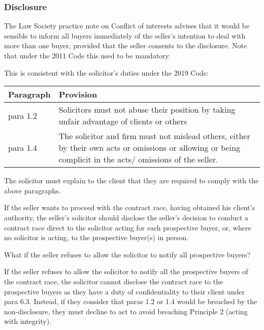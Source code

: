 \documentclass[
]{article}
\newenvironment{env-d6ce83a0-f7a8-46b6-be95-b1235f1feb63}
{
    \savenotes\tcolorbox[blanker,breakable,left=5pt,borderline west={2pt}{-4pt}{gray}]
}
{
    \endtcolorbox\spewnotes
}
\begin{document}
\hypertarget{disclosure}{%
\subsubsection{Disclosure}\label{disclosure}}

The Law Society practice note on Conflict of interests advises that it
would be sensible to inform all buyers immediately of the seller's
intention to deal with more than one buyer, provided that the seller
consents to the disclosure. Note that under the 2011 Code this used to
be mandatory.

This is consistent with the solicitor's duties under the 2019 Code:

\begin{longtable}[]{@{}ll@{}}
\toprule()
Paragraph & Provision \\
\midrule()
\endhead
para 1.2 & Solicitors must not abuse their position by taking unfair
advantage of clients or others \\
para 1.4 & The solicitor and firm must not mislead others, either by
their own acts or omissions or allowing or being complicit in the acts/
omissions of the seller. \\
\bottomrule()
\end{longtable}

The solicitor must explain to the client that they are required to
comply with the above paragraphs.

If the seller wants to proceed with the contract race, having obtained
his client's authority, the seller's solicitor should disclose the
seller's decision to conduct a contract race direct to the solicitor
acting for each prospective buyer, or, where no solicitor is acting, to
the prospective buyer(s) in person.

\begin{env-d6ce83a0-f7a8-46b6-be95-b1235f1feb63}

What if the seller refuses to allow the solicitor to notify all
prospective buyers?

If the seller refuses to allow the solicitor to notify all the
prospective buyers of the contract race, the solicitor cannot disclose
the contract race to the prospective buyers as they have a duty of
confidentiality to their client under para 6.3. Instead, if they
consider that paras 1.2 or 1.4 would be breached by the non-disclosure,
they must decline to act to avoid breaching Principle 2 (acting with
integrity).

\end{env-d6ce83a0-f7a8-46b6-be95-b1235f1feb63}
\end{document}
